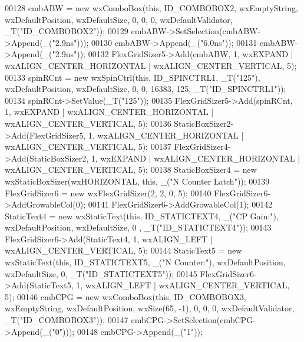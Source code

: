 \begin{DoxyCode}
00128     cmbABW = \textcolor{keyword}{new} wxComboBox(\textcolor{keyword}{this}, ID\_COMBOBOX2, wxEmptyString, wxDefaultPosition, wxDefaultSize, 0, 0, 0, 
      wxDefaultValidator, _T(\textcolor{stringliteral}{"ID\_COMBOBOX2"}));
00129     cmbABW->SetSelection(cmbABW->Append(\_(\textcolor{stringliteral}{"2.9ns"})));
00130     cmbABW->Append(\_(\textcolor{stringliteral}{"6.0ns"}));
00131     cmbABW->Append(\_(\textcolor{stringliteral}{"2.9ns"}));
00132     FlexGridSizer5->Add(cmbABW, 1, wxEXPAND | wxALIGN\_CENTER\_HORIZONTAL | wxALIGN\_CENTER\_VERTICAL, 5);
00133     spinRCnt = \textcolor{keyword}{new} wxSpinCtrl(\textcolor{keyword}{this}, ID\_SPINCTRL1, _T(\textcolor{stringliteral}{"125"}), wxDefaultPosition, wxDefaultSize, 0, 0, 16383,
       125, _T(\textcolor{stringliteral}{"ID\_SPINCTRL1"}));
00134     spinRCnt->SetValue(_T(\textcolor{stringliteral}{"125"}));
00135     FlexGridSizer5->Add(spinRCnt, 1, wxEXPAND | wxALIGN\_CENTER\_HORIZONTAL | wxALIGN\_CENTER\_VERTICAL, 5);
00136     StaticBoxSizer2->Add(FlexGridSizer5, 1, wxALIGN\_CENTER\_HORIZONTAL | wxALIGN\_CENTER\_VERTICAL, 5);
00137     FlexGridSizer4->Add(StaticBoxSizer2, 1, wxEXPAND | wxALIGN\_CENTER\_HORIZONTAL | wxALIGN\_CENTER\_VERTICAL,
       5);
00138     StaticBoxSizer4 = \textcolor{keyword}{new} wxStaticBoxSizer(wxHORIZONTAL, \textcolor{keyword}{this}, \_(\textcolor{stringliteral}{"N Counter Latch"}));
00139     FlexGridSizer6 = \textcolor{keyword}{new} wxFlexGridSizer(2, 2, 0, 5);
00140     FlexGridSizer6->AddGrowableCol(0);
00141     FlexGridSizer6->AddGrowableCol(1);
00142     StaticText4 = \textcolor{keyword}{new} wxStaticText(\textcolor{keyword}{this}, ID\_STATICTEXT4, \_(\textcolor{stringliteral}{"CP Gain:"}), wxDefaultPosition, wxDefaultSize, 0
      , _T(\textcolor{stringliteral}{"ID\_STATICTEXT4"}));
00143     FlexGridSizer6->Add(StaticText4, 1, wxALIGN\_LEFT | wxALIGN\_CENTER\_VERTICAL, 5);
00144     StaticText5 = \textcolor{keyword}{new} wxStaticText(\textcolor{keyword}{this}, ID\_STATICTEXT5, \_(\textcolor{stringliteral}{"N Counter:"}), wxDefaultPosition, wxDefaultSize,
       0, _T(\textcolor{stringliteral}{"ID\_STATICTEXT5"}));
00145     FlexGridSizer6->Add(StaticText5, 1, wxALIGN\_LEFT | wxALIGN\_CENTER\_VERTICAL, 5);
00146     cmbCPG = \textcolor{keyword}{new} wxComboBox(\textcolor{keyword}{this}, ID\_COMBOBOX3, wxEmptyString, wxDefaultPosition, wxSize(65, -1), 0, 0, 0, 
      wxDefaultValidator, _T(\textcolor{stringliteral}{"ID\_COMBOBOX3"}));
00147     cmbCPG->SetSelection(cmbCPG->Append(\_(\textcolor{stringliteral}{"0"})));
00148     cmbCPG->Append(\_(\textcolor{stringliteral}{"1"}));

\end{DoxyCode}
